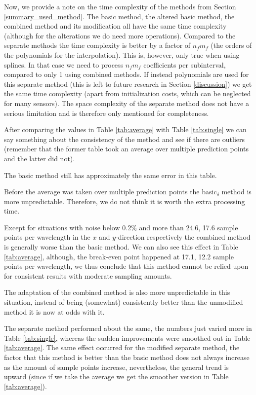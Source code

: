 Now, we provide a note on the time complexity of the methods from Section \ref{summary_used_method}.
The basic method, the altered basic method, the combined method and its modification all have the same time complexity (although for the alterations we do need more operations).
Compared to the separate methods the time complexity is better by a factor of $n_f m_f$ (the orders of the polynomials for the interpolation). This is, however, only true when using splines. In that case we need to process $n_f m_f$ coefficients per subinterval, compared to only 1 using combined methods.
If instead polynomials are used for this separate method (this is left to future research in Section \ref{discussion}) we get the same time complexity (apart from initialization costs, which can be neglected for many sensors).
The space complexity of the separate method does not have a serious limitation and is therefore only mentioned for completeness.


After comparing the values in Table \ref{tab:average} with Table \ref{tab:single} we can say something about the consistency of the method and see if there are outliers (remember that the former table took an average over multiple prediction points and the latter did not).

The basic method still has approximately the same error in this table.

Before the average was taken over multiple prediction points the basic$_\delta$ method is more unpredictable.
Therefore, we do not think it is worth the extra processing time.

Except for situations with noise below 0.2\% and more than 24.6, 17.6 sample points per wavelength in the $x$ and $y$-direction respectively the combined method is generally worse than the basic method.
We can also see this effect in Table \ref{tab:average}, although, the break-even point happened at 17.1, 12.2 sample points per wavelength, we thus conclude that this method cannot be relied upon for consistent results with moderate sampling amounts.

The adaptation of the combined method is also more unpredictable in this situation, instead of being (somewhat) consistently better than the unmodified method it is now at odds with it.

The separate method performed about the same, the numbers just varied more in Table \ref{tab:single}, whereas the sudden improvements were smoothed out in Table \ref{tab:average}.
The same effect occurred for the modified separate method, the factor that this method is better than the basic method does not always increase as the amount of sample points increase, nevertheless, the general trend is upward (since if we take the average we get the smoother version in Table \ref{tab:average}).

